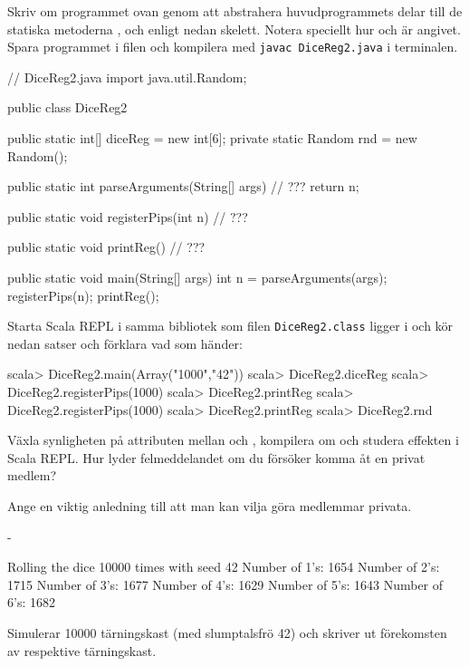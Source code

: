 {\Subtask Skriv om programmet ovan genom att abstrahera huvudprogrammets delar till de statiska metoderna ,  och  enligt nedan skelett. Notera speciellt hur  och  är angivet. Spara programmet i filen  och kompilera med \texttt{javac DiceReg2.java} i terminalen.

\begin{Code}[language=Java]
// DiceReg2.java
import java.util.Random;

public class DiceReg2 {
    public static int[] diceReg = new int[6];
    private static Random rnd = new Random();

    public static int parseArguments(String[] args) {
        // ???
        return n;
    }

    public static void registerPips(int n){
        // ???
    }

    public static void printReg() {
        // ???
    }

    public static void main(String[] args) {
        int n = parseArguments(args);
        registerPips(n);
        printReg();
    }
}
\end{Code}

\Subtask Starta Scala REPL i samma bibliotek som filen \texttt{DiceReg2.class} ligger i och kör nedan satser och förklara vad som händer:
\begin{REPL}
scala> DiceReg2.main(Array("1000","42"))
scala> DiceReg2.diceReg
scala> DiceReg2.registerPips(1000)
scala> DiceReg2.printReg
scala> DiceReg2.registerPips(1000)
scala> DiceReg2.printReg
scala> DiceReg2.rnd
\end{REPL}

\Subtask Växla synligheten på attributen mellan  och , kompilera om och studera effekten i Scala REPL. Hur lyder felmeddelandet om du försöker komma åt en privat medlem?

\Subtask\Pen Ange en viktig anledning till att man kan vilja göra medlemmar privata.



\SOLUTION


\TaskSolved \what


\SubtaskSolved  -

\SubtaskSolved  \begin{REPL}
Rolling the dice 10000 times with seed 42
Number of 1's: 1654
Number of 2's: 1715
Number of 3's: 1677
Number of 4's: 1629
Number of 5's: 1643
Number of 6's: 1682
\end{REPL}
Simulerar 10000 tärningskast (med slumptalsfrö 42) och skriver ut förekomsten av respektive tärningskast.

}
